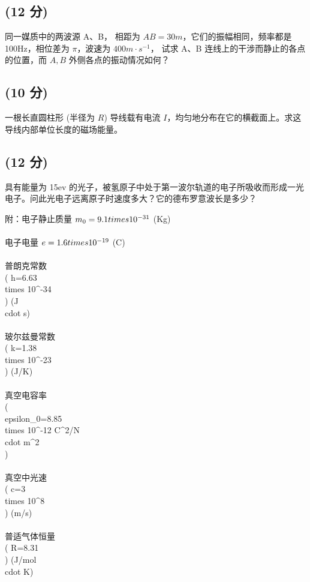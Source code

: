 \subsection{(12 分)}
同一媒质中的两波源 A、B， 相距为 \( AB=30m \)，它们的振幅相同，频率都是 100Hz，相位差为 \( \pi \)，波速为 \( 400m \cdot s^{-1} \)， 试求 A、B 连线上的干涉而静止的各点的位置，而 \(A,B\) 外侧各点的振动情况如何？
\subsection{(10 分)}
一根长直圆柱形 (半径为 \( R\)) 导线载有电流 \( I \)，均匀地分布在它的横截面上。求这导线内部单位长度的磁场能量。
\subsection{(12 分)}
具有能量为 15ev 的光子，被氢原子中处于第一波尔轨道的电子所吸收而形成一光电子。问此光电子远离原子时速度多大？它的德布罗意波长是多少？

附：电子静止质量 \( m_0=9.1 \\times 10^{-31} \) (Kg) \\\\
电子电量 \( e=1.6 \\times 10^{-19} \) (C) \\\\
普朗克常数 \\( h=6.63 \\times 10^{-34} \\) (J \\cdot s) \\\\
玻尔兹曼常数 \\( k=1.38 \\times 10^{-23} \\) (J/K) \\\\
真空电容率 \\( \\epsilon_0=8.85 \\times 10^{-12} C^2/N \\cdot m^2 \\) \\\\
真空中光速 \\( c=3 \\times 10^8 \\) (m/s) \\\\
普适气体恒量 \\( R=8.31 \\) (J/mol \\cdot K)